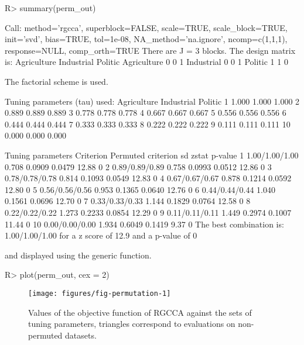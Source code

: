 \documentclass[
]{jss}
\begin{document}
\begin{CodeChunk}
\begin{CodeInput}
R> summary(perm_out)
\end{CodeInput}
\begin{CodeOutput}
Call: method='rgcca', superblock=FALSE, scale=TRUE, scale_block=TRUE, init='svd',
bias=TRUE, tol=1e-08, NA_method='na.ignore', ncomp=c(1,1,1), response=NULL,
comp_orth=TRUE 
There are J = 3 blocks.
The design matrix is:
            Agriculture Industrial Politic
Agriculture           0          0       1
Industrial            0          0       1
Politic               1          1       0

The factorial scheme is used.

Tuning parameters (tau) used: 
   Agriculture Industrial Politic
1        1.000      1.000   1.000
2        0.889      0.889   0.889
3        0.778      0.778   0.778
4        0.667      0.667   0.667
5        0.556      0.556   0.556
6        0.444      0.444   0.444
7        0.333      0.333   0.333
8        0.222      0.222   0.222
9        0.111      0.111   0.111
10       0.000      0.000   0.000

   Tuning parameters Criterion Permuted criterion     sd zstat p-value
1     1.00/1.00/1.00     0.708             0.0909 0.0479 12.88       0
2     0.89/0.89/0.89     0.758             0.0993 0.0512 12.86       0
3     0.78/0.78/0.78     0.814             0.1093 0.0549 12.83       0
4     0.67/0.67/0.67     0.878             0.1214 0.0592 12.80       0
5     0.56/0.56/0.56     0.953             0.1365 0.0640 12.76       0
6     0.44/0.44/0.44     1.040             0.1561 0.0696 12.70       0
7     0.33/0.33/0.33     1.144             0.1829 0.0764 12.58       0
8     0.22/0.22/0.22     1.273             0.2233 0.0854 12.29       0
9     0.11/0.11/0.11     1.449             0.2974 0.1007 11.44       0
10    0.00/0.00/0.00     1.934             0.6049 0.1419  9.37       0
The best combination is: 1.00/1.00/1.00 for a z score of 12.9 and a p-value of 0
\end{CodeOutput}
\end{CodeChunk}

\normalsize

and displayed using the generic  function.

\footnotesize

\begin{CodeChunk}
\begin{CodeInput}
R> plot(perm_out, cex = 2)
\end{CodeInput}
\begin{figure}[H]

{\centering \texttt{[image: figures/fig-permutation-1]} 

}

\caption[Values of the objective function of RGCCA against the sets of tuning parameters, triangles correspond to evaluations on non-permuted datasets]{Values of the objective function of RGCCA against the sets of tuning parameters, triangles correspond to evaluations on non-permuted datasets.}\label{fig:fig-permutation}
\end{figure}
\end{CodeChunk}
\end{document}

